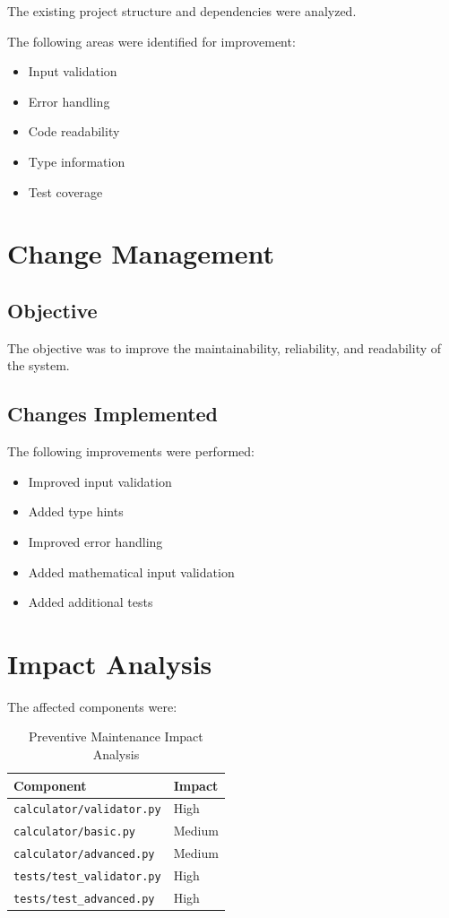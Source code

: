 \documentclass[12pt,a4paper,openany]{report}
\begin{document}
The existing project structure and dependencies were analyzed.

The following areas were identified for improvement:

\begin{itemize}
    \item Input validation
    \item Error handling
    \item Code readability
    \item Type information
    \item Test coverage
\end{itemize}

\section{Change Management}

\subsection{Objective}

The objective was to improve the maintainability, reliability, and
readability of the system.

\subsection{Changes Implemented}

The following improvements were performed:

\begin{itemize}
    \item Improved input validation
    \item Added type hints
    \item Improved error handling
    \item Added mathematical input validation
    \item Added additional tests
\end{itemize}

\section{Impact Analysis}

The affected components were:

\begin{table}[H]
\centering
\renewcommand{\arraystretch}{1.3}
\begin{tabular}{p{6cm} p{3cm}}
\toprule
\textbf{Component} & \textbf{Impact} \\
\midrule
\texttt{calculator/validator.py} & High \\
\texttt{calculator/basic.py} & Medium \\
\texttt{calculator/advanced.py} & Medium \\
\texttt{tests/test\_validator.py} & High \\
\texttt{tests/test\_advanced.py} & High \\
\bottomrule
\end{tabular}
\caption{Preventive Maintenance Impact Analysis}
\end{table}
\end{document}
